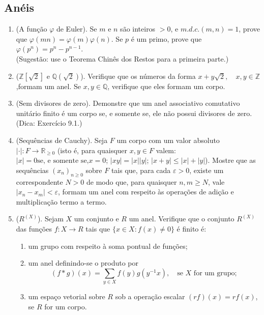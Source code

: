 \subsection{ Anéis}

\begin{enumerate}[label=10.\arabic*.]

    \item (A função $\varphi$ de Euler). Se $m$ e $n$ são inteiros $> 0$, e $m.d.c.(m,n) = 1$, prove que 
    $\varphi(mn) = \varphi(m)\varphi(n)$. Se $p$ é um primo, prove que $\varphi(p^n) = p^n - p^{n-1}$. \\
    (Sugestão: use o Teorema Chinês dos Restos para a primeira parte.) 

    \item ($\mathbb{Z}[\sqrt{2}]$ e $\mathbb{Q}(\sqrt{2})$). Verifique que os números da forma 
    $x + y\sqrt{2}, \quad x,y \in \mathbb{Z}$,formam um anel. Se $x,y \in \mathbb{Q}$, verifique 
    que eles formam um corpo. 

    \item (Sem divisores de zero). Demonstre que um anel associativo comutativo unitário finito 
    é um corpo se, e somente se, ele não possui divisores de zero. \\ 
    (Dica: Exercício 9.1.)

    \item (Sequências de Cauchy). Seja $F$ um corpo com um valor absoluto  $|\cdot| : F \to \mathbb{R}_{\geq 0}$
    (isto é, para quaisquer $x,y \in F$ valem: $|x|=0 \text{se, e somente se,} x=0$; $|xy| = |x||y|$; $|x+y| \leq |x|+|y|$). 
    Mostre que as sequências $(x_n)_{n \geq 0}$ sobre $F$ tais que, para cada $\varepsilon > 0$, existe um correspondente 
    $N > 0$ de modo que, para quaisquer $n,m \geq N$, vale $|x_n - x_m| < \varepsilon$, formam um anel com respeito às 
    operações de adição e multiplicação termo a termo. 

    \item ($R^(X)$). Sejam $X$ um conjunto e $R$ um anel. Verifique que o conjunto $R^{(X)}$ das funções $f: X \to R$ tais que $\{x \in X : f(x) \neq 0\}$ é finito é: 
    \begin{enumerate}[label=(\roman*)]
        \item um grupo com respeito à soma pontual de funções; 
        \item um anel definindo-se o produto por 
        \[
        (f*g)(x) = \sum_{y \in X} f(y)g(y^{-1}x), \quad \text{se $X$ for um grupo};
        \] 
        \item um espaço vetorial sobre $R$ sob a operação escalar $(rf)(x) = r f(x)$, se $R$ for um corpo.
    \end{enumerate}


\end{enumerate}
